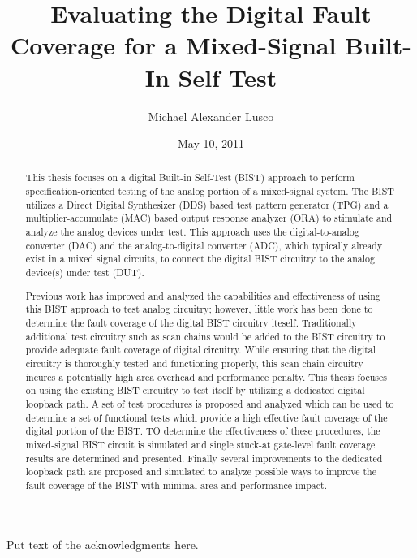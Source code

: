 \documentclass[12pt]{report}
\title{Evaluating the Digital Fault Coverage for a Mixed-Signal Built-In Self Test}
\author{Michael Alexander Lusco}
\date{May 10, 2011} %
\begin{document}
\begin{romanpages}      %

\TitlePage 

\begin{abstract}
This thesis focuses on a digital Built-in Self-Test (BIST) approach to perform specification-oriented testing of the analog portion of a mixed-signal system.  The BIST utilizes a Direct Digital Synthesizer (DDS) based test pattern generator (TPG) and a multiplier-accumulate (MAC) based output response analyzer (ORA) to stimulate and analyze the analog devices under test.  This approach uses the digital-to-analog converter (DAC) and the analog-to-digital converter (ADC), which typically already exist in a mixed signal circuits, to connect the digital BIST circuitry to the analog device(s) under test (DUT).

Previous work has improved and analyzed the capabilities and effectiveness of using this BIST approach to test analog circuitry; however, little work has been done to determine the fault coverage of the digital BIST circuitry iteself.  Traditionally additional test circuitry such as scan chains would be added to the BIST circuitry to provide adequate fault coverage of digital circuitry.  While ensuring that the digital circuitry is thoroughly tested and functioning properly, this scan chain circuitry incures a potentially high area overhead and performance penalty.  This thesis focuses on using the existing BIST circuitry to test itself by utilizing a dedicated digital loopback path.  A set of test procedures is proposed and analyzed which can be used to determine a set of functional tests which provide a high effective fault coverage of the digital portion of the BIST.  TO determine the effectiveness of these procedures, the mixed-signal BIST circuit is simulated and single stuck-at gate-level fault coverage results are determined and presented.  Finally several improvements to the dedicated loopback path are proposed and simulated to analyze possible ways to improve the fault coverage of the BIST with minimal area and performance impact.
\end{abstract}

\begin{acknowledgments}
Put text of the acknowledgments here.
\end{acknowledgments}

\tableofcontents
\listoffigures
\listoftables

\printnomenclature[0.5in] %
\end{romanpages}        %
\end{document}
